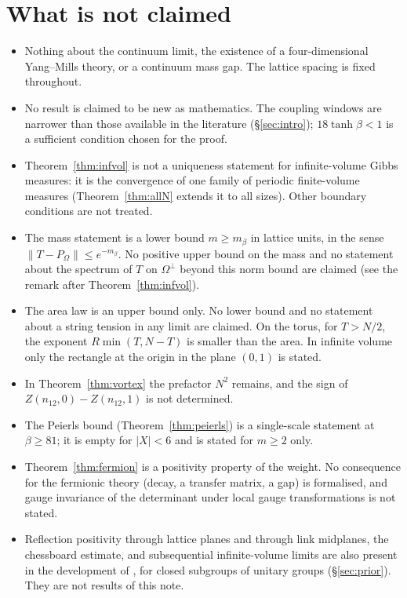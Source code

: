 \documentclass[11pt,a4paper]{article}
\theoremstyle{definition}
\theoremstyle{remark}
\begin{document}
\section{What is not claimed}\label{sec:notclaimed}
\begin{itemize}[leftmargin=1.5em]
\item Nothing about the continuum limit, the existence of a four-dimensional Yang--Mills theory, or a continuum mass gap. The lattice spacing is fixed throughout.
\item No result is claimed to be new as mathematics. The coupling windows are narrower than those available in the literature (\S\ref{sec:intro}); $18\tanh\beta<1$ is a sufficient condition chosen for the proof.
\item Theorem~\ref{thm:infvol} is not a uniqueness statement for infinite-volume Gibbs measures: it is the convergence of one family of periodic finite-volume measures (Theorem~\ref{thm:allN} extends it to all sizes). Other boundary conditions are not treated.
\item The mass statement is a lower bound $m\ge m_\beta$ in lattice units, in the sense $\|T-P_\Omega\|\le e^{-m_\beta}$. No positive upper bound on the mass and no statement about the spectrum of $T$ on $\Omega^\perp$ beyond this norm bound are claimed (see the remark after Theorem~\ref{thm:infvol}).
\item The area law is an upper bound only. No lower bound and no statement about a string tension in any limit are claimed. On the torus, for $T>N/2$, the exponent $R\min(T,N-T)$ is smaller than the area. In infinite volume only the rectangle at the origin in the plane $(0,1)$ is stated.
\item In Theorem~\ref{thm:vortex} the prefactor $N^2$ remains, and the sign of $Z(n_{12},0)-Z(n_{12},1)$ is not determined.
\item The Peierls bound (Theorem~\ref{thm:peierls}) is a single-scale statement at $\beta\ge81$; it is empty for $|X|<6$ and is stated for $m\ge2$ only.
\item Theorem~\ref{thm:fermion} is a positivity property of the weight. No consequence for the fermionic theory (decay, a transfer matrix, a gap) is formalised, and gauge invariance of the determinant under local gauge transformations is not stated.
\item Reflection positivity through lattice planes and through link midplanes, the chessboard estimate, and subsequential infinite-volume limits are also present in the development of \cite{OAI}, for closed subgroups of unitary groups (\S\ref{sec:prior}). They are not results of this note.
\end{itemize}
\end{document}
